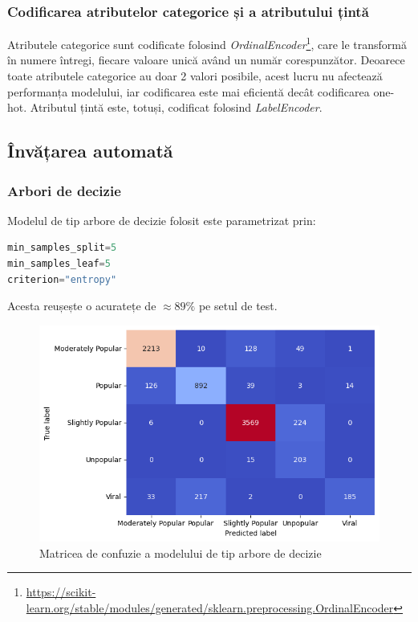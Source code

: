 \documentclass{article}
\begin{document}
\subsubsection{Codificarea atributelor categorice și a atributului țintă}
Atributele categorice sunt codificate folosind \textit{OrdinalEncoder}\footnote{
    \url{https://scikit-learn.org/stable/modules/generated/sklearn.preprocessing.OrdinalEncoder}
}, care le transformă în numere întregi, fiecare valoare unică având un număr
corespunzător. Deoarece toate atributele categorice au doar 2 valori posibile,
acest lucru nu afectează performanța modelului, iar codificarea este mai 
eficientă decât codificarea one-hot. Atributul țintă este, totuși, codificat
folosind \textit{LabelEncoder}.

\subsection{Învățarea automată}
\subsubsection{Arbori de decizie}
Modelul de tip arbore de decizie folosit este parametrizat prin: 
\begin{lstlisting}[language=Python]
min_samples_split=5
min_samples_leaf=5
criterion="entropy"
\end{lstlisting}

Acesta reușește o acuratețe de $\approx 89\%$ pe setul de test.

\begin{figure}[htb]
    \centering
    \includegraphics[scale=0.5]{news_popularity/learning/decision_conf.png}
    \caption{Matricea de confuzie a modelului de tip arbore de decizie}
    \label{fig:news:dt_conf}
\end{figure}
\end{document}

